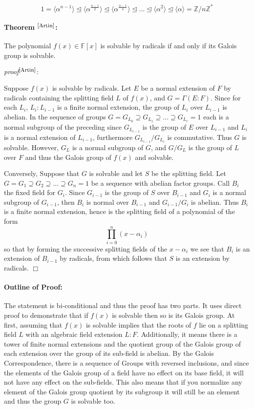 \documentclass{article}
\begin{document}
$$ 1 = \langle \alpha^{n-1}   \rangle \trianglelefteq \langle\alpha^{\frac{n-1}{2}}\rangle \trianglelefteq \langle\alpha^{\frac{n-1}{4}}\rangle \trianglelefteq... \trianglelefteq \langle\alpha^2\rangle \trianglelefteq \langle\alpha\rangle = \mathbb{Z}/n\mathbb{Z}^* $$

\paragraph{Theorem $^{\textrm{\footnotesize\cite{Artin}}}$:} The polynomial $f(x)\in\mathbb{F}[x]$ is solvable by radicals if and only if its Galois group is solvable.
\par
\textit{proof}$^{\textrm{\footnotesize\cite{Artin}}}$:
\par
Suppose $f(x)$ is solvable by radicals. Let $E$ be a normal extension of $F$ by radicals containing the splitting field $L$ of $f(x)$, and $G = \Gamma(E: F)$. Since for each $L_i$, $L_i:L_{i-1}$ is a finite normal extension, the group  of $L_i$ over $L_{i-1}$ is abelian. In the sequence of groups $G = G_{L_0} \supseteq G_{L_1} \supseteq ... \supseteq G_{L_r} = 1$ each is a normal subgroup of the preceding since $G_{L_{i-1}}$ is the group of $E$ over $L_{i-1}$ and $L_i$ is a normal extension of $L_{i-1}$, furthermore $G_{L_{i-1}}/G_{L_i}$ is commutative. Thus $G$ is solvable. However, $G_L$ is a normal subgroup of $G$, and $G/G_L$ is the group of $L$ over $F$ and thus the Galois group of $f(x)$ and solvable.
\par
Conversely, Suppose that $G$ is solvable and let $S$ be the splitting field. Let $G = G_1 \supseteq G_2 \supseteq ... \supseteq G_n = 1$ be a sequence with abelian factor groups. Call $B_i$ the fixed field for $G_i$. Since $G_{i-1}$ is the group of $S$ over $B_{i-1}$ and $G_i$ is a normal subgroup of $G_{i-1}$, then $B_i$ is normal over $B_{i-1}$ and $G_{i-1}/G_i$ is abelian. Thus $B_i$ is a finite normal extension, hence is the splitting field of a polynomial of the form 
$$\prod_{i=0}^{n}(x-\alpha_{i})$$
so that by forming the successive splitting fields of the $x-\alpha_{i}$ we see that $B_i$ is an extension of $B_{i-1}$ by radicals, from which follows that $S$ is an extension by radicals. $\Box$

\paragraph{Outline of Proof:}
The statement is bi-conditional and thus the proof has two parts. It uses direct proof to demonstrate that if $f(x)$ is solvable then so is its Galois group. At first, assuming that $f(x)$ is solvable implies that the roots of $f$ lie on a splitting field $L$ with an algebraic field extension $L: F$. Additionally, it means there is a tower of finite normal extensions and the quotient group of the Galois group of each extension over the group of its sub-field is abelian. By the Galois Correspondence, there is a sequence of Groups with reversed inclusions, and since the elements of the Galois group of a field have no effect on its base field, it will not have any effect on the sub-fields. This also means that if you normalize any element of the Galois group quotient by its subgroup it will still be an element and thus the group $G$ is solvable too.
\end{document}
